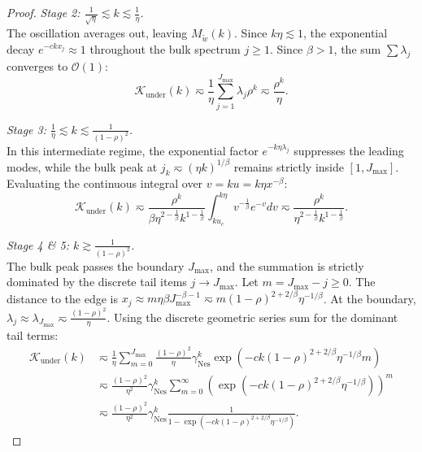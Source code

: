 \begin{proof}
\textit{Stage 2: $\frac{1}{\sqrt{\eta}} \lesssim k \lesssim \frac{1}{\eta}$.} \\
The oscillation averages out, leaving $M_{\tilde{w}}(k)$. Since $k \eta \lesssim 1$, the exponential decay $e^{-ckx_j} \approx 1$ throughout the bulk spectrum $j \ge 1$. Since $\beta > 1$, the sum $\sum \lambda_j$ converges to $\mathcal{O}(1)$:
\[
    \mathcal K_{\mathrm{under}}(k) \eqsim \frac{1}{\eta} \sum_{j=1}^{J_{\max}} \lambda_j \rho^k \eqsim \frac{\rho^k}{\eta}.
\]

\textit{Stage 3: $\frac{1}{\eta} \lesssim k \lesssim \frac{1}{(1-\rho)^2}$.} \\
In this intermediate regime, the exponential factor $e^{-k\eta \lambda_j}$ suppresses the leading modes, while the bulk peak at $j_k \eqsim (\eta k)^{1/\beta}$ remains strictly inside $[1, J_{\max}]$. Evaluating the continuous integral over $v = k u = k \eta x^{-\beta}$:
\[
    \mathcal K_{\mathrm{under}}(k) \eqsim \frac{\rho^k}{\beta \eta^{2-\frac{1}{\beta}} k^{1-\frac{1}{\beta}}} \int_{k u_c}^{k\eta} v^{-\frac{1}{\beta}} e^{-v} dv \eqsim \frac{\rho^k}{\eta^{2-\frac1\beta} k^{1-\frac1\beta}}.
\]

\textit{Stage 4 \& 5: $k \gtrsim \frac{1}{(1-\rho)^2}$.} \\
The bulk peak passes the boundary $J_{\max}$, and the summation is strictly dominated by the discrete tail items $j \to J_{\max}$. Let $m = J_{\max} - j \ge 0$. The distance to the edge is $x_j \approx m \eta\beta J_{\max}^{-\beta-1} \eqsim m (1-\rho)^{2+2/\beta}\eta^{-1/\beta}$. 
At the boundary, $\lambda_j \approx \lambda_{J_{\max}} \eqsim \frac{(1-\rho)^2}{\eta}$. Using the discrete geometric series sum for the dominant tail terms:
\begin{align*}
    \mathcal K_{\mathrm{under}}(k) 
    &\eqsim \frac{1}{\eta} \sum_{m=0}^{J_{\max}} \frac{(1-\rho)^2}{\eta} \gamma_{\mathrm{Nes}}^k \exp\left(-c k (1-\rho)^{2+2/\beta}\eta^{-1/\beta} m\right) \\
    &\eqsim \frac{(1-\rho)^2}{\eta^2} \gamma_{\mathrm{Nes}}^k \sum_{m=0}^{\infty} \left( \exp\left(-c k (1-\rho)^{2+2/\beta}\eta^{-1/\beta}\right) \right)^m \\
    &\eqsim \frac{(1-\rho)^2}{\eta^2} \gamma_{\mathrm{Nes}}^k \frac{1}{1 - \exp\left(-c k (1-\rho)^{2+2/\beta}\eta^{-1/\beta}\right)}.
\end{align*}


\end{proof}

